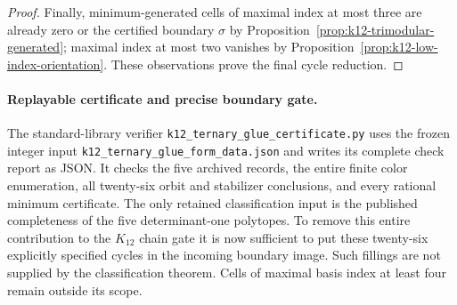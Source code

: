 \begin{proof}
Finally, minimum-generated cells of maximal index at most three
are already zero or the certified boundary $\sigma$ by
Proposition~\ref{prop:k12-trimodular-generated}; maximal index at most
two vanishes by Proposition~\ref{prop:k12-low-index-orientation}.
These observations prove the final cycle reduction.
\end{proof}

\paragraph{Replayable certificate and precise boundary gate.}
The standard-library verifier
\texttt{k12\_ternary\_glue\_certificate.py} uses the frozen integer
input \texttt{k12\_ternary\_glue\_form\_data.json} and writes its
complete check report as JSON. It checks the five archived records,
the entire finite color enumeration, all twenty-six orbit and
stabilizer conclusions, and every rational minimum certificate.
The only retained classification input is the published completeness
of the five determinant-one polytopes.
To remove this entire contribution to the $K_{12}$ chain gate it is
now sufficient to put these twenty-six explicitly specified cycles
in the incoming boundary image. Such fillings are not supplied by
the classification theorem. Cells of maximal basis index at least
four remain outside its scope.
